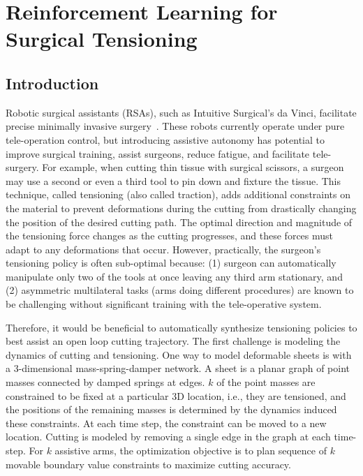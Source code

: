 \chapter{Reinforcement Learning for Surgical Tensioning}

\section{Introduction}
Robotic surgical assistants (RSAs), such as Intuitive Surgical's da Vinci, facilitate precise minimally invasive surgery~\cite{veldkamp2005laparoscopic}. These robots currently operate under pure tele-operation control, but introducing assistive autonomy has potential to improve surgical training, assist surgeons, reduce fatigue, and facilitate tele-surgery.
For example, when cutting thin tissue with surgical scissors, a surgeon may use a second or even a third tool to pin down and fixture the tissue.
This technique, called tensioning (also called traction), adds additional constraints on the material to prevent deformations during the cutting from drastically changing the position of the desired cutting path.
The optimal direction and magnitude of the tensioning force changes as the cutting progresses, and these forces must adapt to any deformations that occur. 
However, practically, the surgeon's tensioning policy is often sub-optimal because: (1) surgeon can automatically manipulate only two of the tools at once leaving any third arm stationary, and (2) asymmetric multilateral tasks (arms doing different procedures) are known to be challenging without significant training with the tele-operative system.

Therefore, it would be beneficial to automatically synthesize tensioning policies to best assist an open loop cutting trajectory. The first challenge is modeling the dynamics of cutting and tensioning. One way to model deformable sheets is with a 3-dimensional mass-spring-damper network. A sheet is a planar graph of point masses connected by damped springs at edges. $k$ of the point masses are constrained to be fixed at a particular 3D location, i.e., they are tensioned, and the positions of the remaining masses is determined by the dynamics induced these constraints. At each time step, the constraint can be moved to a new location. Cutting is modeled by removing a single edge in the graph at each time-step.  For $k$ assistive arms, the optimization objective is to plan  sequence of $k$ movable boundary value constraints to maximize cutting accuracy.


